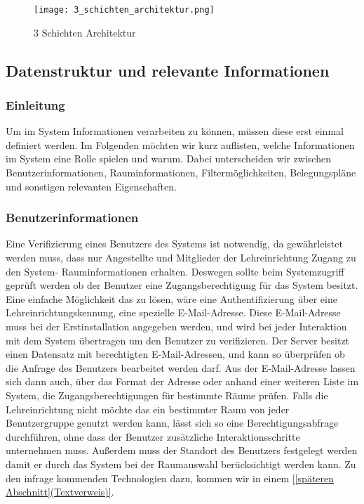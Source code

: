 \begin{figure}
	\centering
	\texttt{[image: 3\_schichten\_architektur.png]}
	\caption{3 Schichten Architektur}
\end{figure}

\subsection{Datenstruktur und relevante Informationen}
\label{sec:Datenstruktur und relevante Informationen}

\subsubsection{Einleitung}
\label{sec:Datenstruktur und relevante Informationen Einleitung}

Um im System Informationen verarbeiten zu können, müssen diese erst einmal
definiert werden. Im Folgenden möchten wir kurz auflisten, welche Informationen
im System eine Rolle spielen und warum. Dabei unterscheiden wir zwischen
Benutzerinformationen, Rauminformationen, Filtermöglichkeiten, Belegungspläne
und sonstigen relevanten Eigenschaften.

\subsubsection{Benutzerinformationen}
\label{sec:Benutzerinformationen}

Eine Verifizierung eines Benutzers des Systems ist notwendig, da gewährleistet
werden muss, dass nur Angestellte und Mitglieder der Lehreinrichtung Zugang zu
den System- \bzw Rauminformationen erhalten. Deswegen sollte beim Systemzugriff
geprüft werden ob der Benutzer eine Zugangsberechtigung für das System besitzt.
Eine einfache Möglichkeit das zu lösen, wäre eine Authentifizierung über eine
Lehreinrichtungskennung, \zB eine spezielle E-Mail-Adresse.
Diese E-Mail-Adresse muss bei der Erstinstallation angegeben werden, und wird
bei jeder Interaktion mit dem System übertragen um den Benutzer zu
verifizieren. Der Server besitzt einen Datensatz mit berechtigten
E-Mail-Adressen, und kann so überprüfen ob die Anfrage des Benutzers bearbeitet
werden darf. Aus der E-Mail-Adresse lassen sich dann auch, \zB über das Format
der Adresse oder anhand einer weiteren Liste im System, die
Zugangsberechtigungen für bestimmte Räume prüfen. Falls die Lehreinrichtung
nicht möchte das ein bestimmter Raum von jeder Benutzergruppe genutzt werden
kann, lässt sich so eine Berechtigungsabfrage durchführen, ohne dass der
Benutzer zusätzliche Interaktionsschritte unternehmen muss. Außerdem muss der
Standort des Benutzers festgelegt werden damit er durch das System bei der
Raumauswahl berücksichtigt werden kann. Zu den infrage kommenden Technologien
dazu, kommen wir in einem \ref{[späteren Abschnitt](Textverweis)}.

